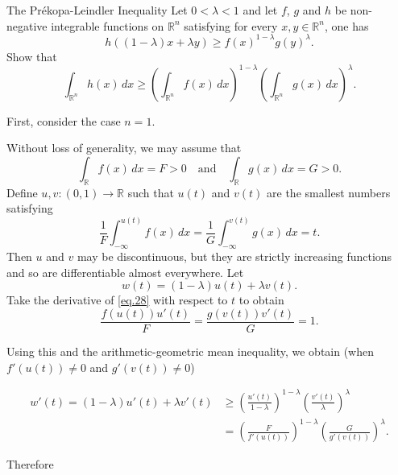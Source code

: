 \documentclass[UTF8,a4paper,10pt]{article}
\begin{document}
\begin{Problem}[]{The Prékopa-Leindler Inequality}
  Let $0 < \lambda < 1$ and let $f$, $g$ and $h$ be non-negative integrable functions on $\mathbb{R}^n$ satisfying for every $x, y \in \mathbb{R}^n$, one has
  $$
  h\left((1 - \lambda)x + \lambda y\right) \geq f(x)^{1-\lambda} g(y)^\lambda.
  $$
  Show that
  $$
  \int_{\mathbb{R}^n} h(x) \, dx \geq \left(\int_{\mathbb{R}^n} f(x) \, dx\right)^{1-\lambda} \left(\int_{\mathbb{R}^n} g(x) \, dx\right)^\lambda.
  $$
  
\end{Problem}

First, consider the case \(n=1\).


Without loss of generality, we may assume that
\begin{equation}
\int_{\mathbb{R}} f(x) \, dx = F > 0 \quad \text{and} \quad \int_{\mathbb{R}} g(x) \, dx = G > 0.
\end{equation}
Define $u, v : (0, 1) \rightarrow \mathbb{R}$ such that $u(t)$ and $v(t)$ are the smallest numbers satisfying
\begin{equation}\label{eq.28}
\frac{1}{F} \int_{-\infty}^{u(t)} f(x) \, dx = \frac{1}{G} \int_{-\infty}^{v(t)} g(x) \, dx = t.
\end{equation}
Then $u$ and $v$ may be discontinuous, but they are strictly increasing functions and so are differentiable almost everywhere. Let
\begin{equation}
w(t) = (1 - \lambda)u(t) + \lambda v(t).
\end{equation}
Take the derivative of \eqref{eq.28} with respect to $t$ to obtain
\begin{equation}
\frac{f(u(t)) u'(t)}{F} = \frac{g(v(t)) v'(t)}{G} = 1.
\end{equation}

Using this and the arithmetic-geometric mean inequality, we obtain (when $f'(u(t)) \neq 0$ and $g'(v(t)) \neq 0$)


\begin{equation}
\begin{aligned}
w'(t) = (1 - \lambda)u'(t) + \lambda v'(t) &\geq \left(\frac{u'(t)}{1-\lambda}\right)^{1-\lambda} \left(\frac{v'(t)}{\lambda}\right)^\lambda\\
 &= \left(\frac{F}{f'(u(t))}\right)^{1-\lambda} \left(\frac{G}{g'(v(t))}\right)^\lambda.
\end{aligned}
\end{equation}

Therefore
\end{document}
